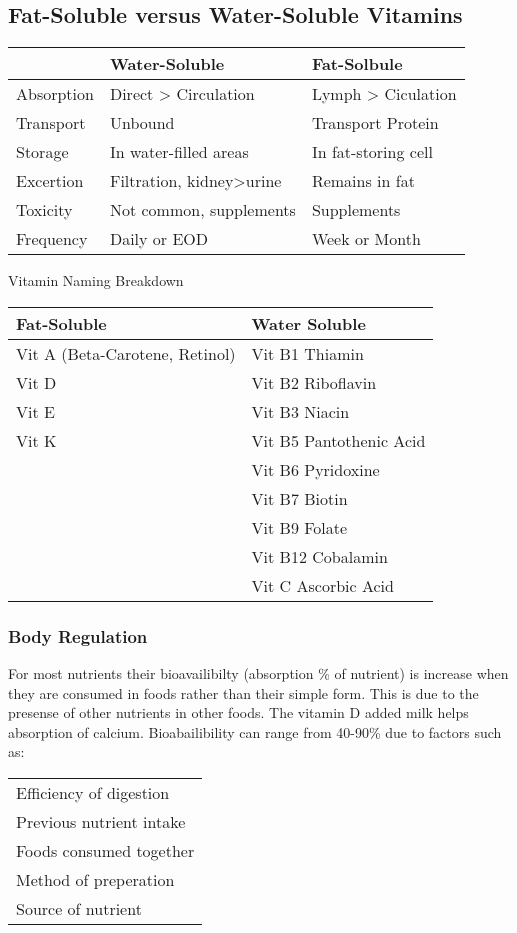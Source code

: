 \documentclass[letterpaper, 11pt]{article}
\begin{document}
\subsection{Fat-Soluble versus Water-Soluble Vitamins}
\label{sec:orgd6d45ba}
\begin{center}
\begin{tabular}{l|ll}
 & Water-Soluble & Fat-Solbule\\
\hline
Absorption & Direct > Circulation & Lymph > Ciculation\\
Transport & Unbound & Transport Protein\\
Storage & In water-filled areas & In fat-storing cell\\
Excertion & Filtration, kidney>urine & Remains in fat\\
Toxicity & Not common, supplements & Supplements\\
Frequency & Daily or EOD & Week or Month\\
\end{tabular}
\end{center}
Vitamin Naming Breakdown\\
\begin{center}
\begin{tabular}{ll}
Fat-Soluble & Water Soluble\\
\hline
Vit A (Beta-Carotene, Retinol) & Vit B1 Thiamin\\
Vit D & Vit B2 Riboflavin\\
Vit E & Vit B3 Niacin\\
Vit K & Vit B5 Pantothenic Acid\\
 & Vit B6 Pyridoxine\\
 & Vit B7 Biotin\\
 & Vit B9 Folate\\
 & Vit B12 Cobalamin\\
 & Vit C Ascorbic Acid\\
\end{tabular}
\end{center}
\subsubsection{Body Regulation}
\label{sec:orge5003fe}
For most nutrients their bioavailibilty (absorption \% of nutrient) is increase when they are consumed in foods rather than their simple form. This is due to the presense of other nutrients in other foods. The vitamin D added milk helps absorption of calcium. Bioabailibility can range from 40-90\% due to factors such as:\\
\begin{center}
\begin{tabular}{l}
Efficiency of digestion\\
Previous nutrient intake\\
Foods consumed together\\
Method of preperation\\
Source of nutrient\\
\end{tabular}
\end{center}
\end{document}
